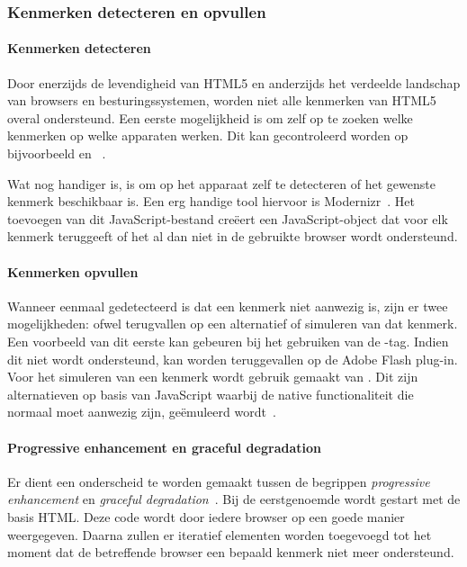 \subsubsection{Kenmerken detecteren en opvullen}
\paragraph{Kenmerken detecteren}
Door enerzijds de levendigheid van HTML5 en anderzijds het verdeelde landschap van browsers en besturingssystemen, worden niet alle kenmerken van HTML5 overal ondersteund. 
Een eerste mogelijkheid is om zelf op te zoeken welke kenmerken op welke apparaten werken. 
Dit kan gecontroleerd worden op bijvoorbeeld  en ~\cite{MacDonald2011}. 

Wat nog handiger is, is om op het apparaat zelf te detecteren of het gewenste kenmerk beschikbaar is. 
Een erg handige tool hiervoor is Modernizr~\cite{Modernizr2012}. 
Het toevoegen van dit JavaScript-bestand creëert een JavaScript-object dat voor elk kenmerk teruggeeft of het al dan niet in de gebruikte browser wordt ondersteund.

\paragraph{Kenmerken opvullen}
Wanneer eenmaal gedetecteerd is dat een kenmerk niet aanwezig is, zijn er twee mogelijkheden: ofwel terugvallen op een alternatief of simuleren van dat kenmerk. 
Een voorbeeld van dit eerste kan gebeuren bij het gebruiken van de -tag. 
Indien dit niet wordt ondersteund, kan worden teruggevallen op de Adobe Flash plug-in. 
Voor het simuleren van een kenmerk wordt gebruik gemaakt van . 
Dit zijn alternatieven op basis van JavaScript waarbij de native functionaliteit die normaal moet aanwezig zijn, geëmuleerd wordt~\cite{MacDonald2011,Weyl2011}.

\paragraph{Progressive enhancement en graceful degradation}
\label{par:progressive-enhancement}
Er dient een onderscheid te worden gemaakt tussen de begrippen \emph{progressive enhancement} en \emph{graceful degradation}~\cite{Hens2012}. 
Bij de eerstgenoemde wordt gestart met de basis HTML.
Deze code wordt door iedere browser op een goede manier weergegeven. 
Daarna zullen er iteratief elementen worden toegevoegd tot het moment dat de betreffende browser een bepaald kenmerk niet meer ondersteund.

